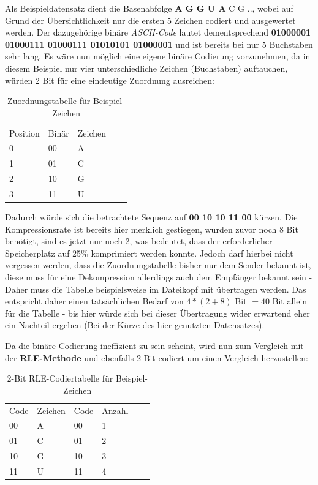 \documentclass[11pt,a4paper,ngerman]{report}
\begin{document}
		Als Beispieldatensatz dient die Basenabfolge \textbf{A G G U A} C G  .., wobei auf Grund der Übersichtlichkeit nur die ersten 5 Zeichen codiert und ausgewertet werden. Der dazugehörige binäre \textit{ASCII-Code} lautet dementsprechend \textbf{01000001 01000111 01000111 01010101 01000001 } und ist bereits bei nur 5 Buchstaben sehr lang.
		Es wäre nun möglich eine eigene binäre Codierung vorzunehmen, da in diesem Beispiel nur vier unterschiedliche Zeichen (Buchstaben) auftauchen, würden 2 Bit für eine eindeutige Zuordnung ausreichen: 
			
		\begin{table} [H]
				\begin{center}
				\centering
				\begin{tabular}{lllll}
					Position  & Binär & Zeichen &  &  \\
					0 & 00    & A       &  &  \\
					1 & 01    & C       &  &  \\
					2 & 10    & G       &  & \\
					3 & 11	  & U
				\end{tabular}
			\caption{Zuordnungstabelle für Beispiel-Zeichen}
			\end{center}
			\end{table}
	   
	    Dadurch würde sich die betrachtete Sequenz auf \textbf{00 10 10 11 00} kürzen. Die Kompressionsrate ist bereits hier merklich gestiegen, wurden zuvor noch 8 Bit benötigt, sind es jetzt nur noch 2, was bedeutet, dass der erforderlicher Speicherplatz auf 25\% komprimiert werden konnte. Jedoch darf hierbei nicht vergessen werden, dass die Zuordnungstabelle bisher nur dem Sender bekannt ist, diese muss für eine Dekompression allerdings auch dem Empfänger bekannt sein - Daher muss die Tabelle beispielsweise im  Dateikopf mit übertragen werden. Das entspricht daher einen tatsächlichen Bedarf von $4 * (2 +8)$ Bit $= 40$ Bit allein für die Tabelle - bis hier würde sich bei dieser Übertragung wider erwartend eher ein Nachteil ergeben (Bei der Kürze des hier genutzten Datensatzes).
		
		Da die binäre Codierung ineffizient zu sein scheint, wird nun zum Vergleich mit der  \textbf{RLE-Methode} und ebenfalls 2 Bit codiert um einen Vergleich herzustellen: 
		
				\begin{table} [H]
				\begin{center}
					\centering
					\begin{tabular}{ll|llll}
						Code  & Zeichen & Code & Anzahl & &  \\ 
						00 & A    & 00    & 1   &  &  \\
						01 & C    & 01   & 2  &  &  \\
				     	10 & G    & 10    & 3  &  & \\
						11 & U	  & 11   & 4
						
					\end{tabular}
					\label{RLE}		
					\caption{2-Bit RLE-Codiertabelle für Beispiel-Zeichen}
				\end{center}
				\end{table}
		
\end{document}
